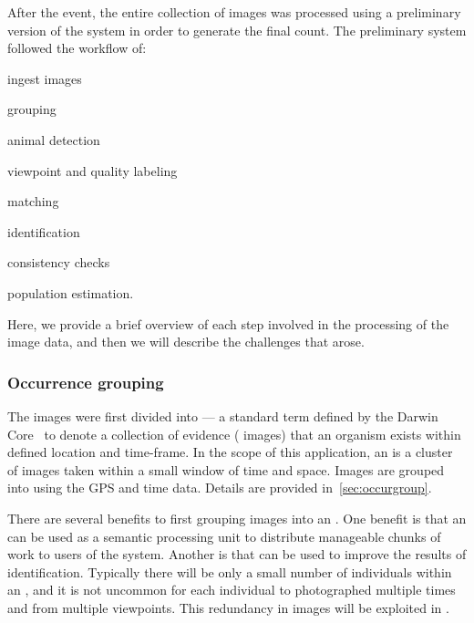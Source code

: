         After the event, the entire collection of images was processed using a preliminary version of the system in
        order to generate the final count. The preliminary system followed the workflow of: %
        \begin{enumin}
            \item ingest images  %
            \item \occurrence{} grouping  %
            \item animal detection %
            \item viewpoint and quality labeling  %
            \item \intraoccurrence{} matching %
            \item \vsexemplar{} identification %
            \item consistency checks  %
            \item population estimation.  %
        \end{enumin}
        Here, we provide a brief overview of each step involved in the processing of the \GZC{} image data, and then we
        will describe the challenges that arose.

        \subsubsection{Occurrence grouping}
            The images were first divided into \glossterm{\occurrences{}} --- a standard term defined by the Darwin
            Core~\cite{wieczorek_darwin_2012} to denote a collection of evidence (\eg{} images) that an organism exists
            within defined location and time-frame. In the scope of this application, an \occurrence{} is a cluster of
            images taken within a small window of time and space. Images are grouped into \occurrences{} using the GPS
            and time data. Details are provided in~\cref{sec:occurgroup}.

            There are several benefits to first grouping images into an \occurrence{}. One benefit is that an
            \occurrence{} can be used as a semantic processing unit to distribute manageable chunks of work to users of
            the system. Another is that \occurrences{} can be used to improve the results of identification. Typically
            there will be only a small number of individuals within an \occurrence{}, and it is not uncommon for each
            individual to photographed multiple times and from multiple viewpoints. This redundancy in images will be
            exploited in .

